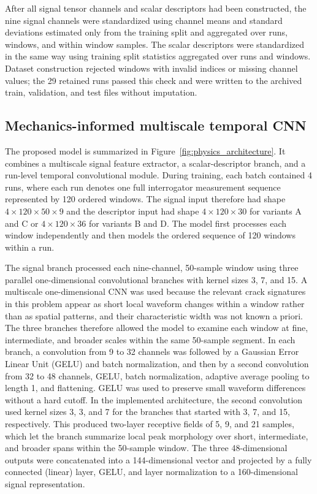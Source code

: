 \documentclass[fleqn,10pt]{wlscirep}
\begin{document}
After all signal tensor channels and scalar descriptors had been constructed, the nine signal channels were standardized using channel means and standard deviations estimated only from the training split and aggregated over runs, windows, and within window samples. The scalar descriptors were standardized in the same way using training split statistics aggregated over runs and windows. Dataset construction rejected windows with invalid indices or missing channel values; the 29 retained runs passed this check and were written to the archived train, validation, and test files without imputation.

\subsection*{Mechanics-informed multiscale temporal CNN}

The proposed model is summarized in Figure~\ref{fig:physics_architecture}. It combines a multiscale signal feature extractor, a scalar-descriptor branch, and a run-level temporal convolutional module. During training, each batch contained 4 runs, where each run denotes one full interrogator measurement sequence represented by 120 ordered windows. The signal input therefore had shape $4\times120\times50\times9$ and the descriptor input had shape $4\times120\times30$ for variants A and C or $4\times120\times36$ for variants B and D. The model first processes each window independently and then models the ordered sequence of 120 windows within a run.

The signal branch processed each nine-channel, 50-sample window using three parallel one-dimensional convolutional branches with kernel sizes 3, 7, and 15. A multiscale one-dimensional CNN was used because the relevant crack signatures in this problem appear as short local waveform changes within a window rather than as spatial patterns, and their characteristic width was not known a priori. The three branches therefore allowed the model to examine each window at fine, intermediate, and broader scales within the same 50-sample segment. In each branch, a convolution from 9 to 32 channels was followed by a Gaussian Error Linear Unit (GELU) and batch normalization, and then by a second convolution from 32 to 48 channels, GELU, batch normalization, adaptive average pooling to length 1, and flattening. GELU was used to preserve small waveform differences without a hard cutoff. In the implemented architecture, the second convolution used kernel sizes 3, 3, and 7 for the branches that started with 3, 7, and 15, respectively. This produced two-layer receptive fields of 5, 9, and 21 samples, which let the branch summarize local peak morphology over short, intermediate, and broader spans within the 50-sample window. The three 48-dimensional outputs were concatenated into a 144-dimensional vector and projected by a fully connected (linear) layer, GELU, and layer normalization to a 160-dimensional signal representation.
\end{document}
